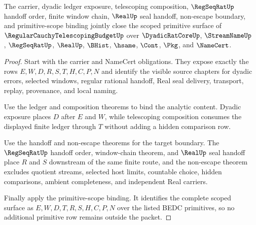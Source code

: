 \begin{theorem}
\label{thm:regular-cauchy-telescoping-budget-scoped-closure}
The carrier, dyadic ledger exposure, telescoping composition, $\RegSeqRatUp$ handoff order, finite window chain, $\RealUp$ seal handoff, non-escape boundary, and primitive-scope binding jointly close the scoped primitive surface of $\RegularCauchyTelescopingBudgetUp$ over $\DyadicRatCoreUp$, $\StreamNameUp$, $\RegSeqRatUp$, $\RealUp$, $\BHist$, $\hsame$, $\Cont$, $\Pkg$, and $\NameCert$.
\end{theorem}
\begin{proof}
Start with the carrier and NameCert obligations. They expose exactly the rows $E,W,D,R,S,T,H,C,P,N$ and identify the visible source chapters for dyadic errors, selected windows, regular rational handoff, Real seal delivery, transport, replay, provenance, and local naming.

Use the ledger and composition theorems to bind the analytic content. Dyadic exposure places $D$ after $E$ and $W$, while telescoping composition consumes the displayed finite ledger through $T$ without adding a hidden comparison row.

Use the handoff and non-escape theorems for the target boundary. The $\RegSeqRatUp$ handoff order, window-chain theorem, and $\RealUp$ seal handoff place $R$ and $S$ downstream of the same finite route, and the non-escape theorem excludes quotient streams, selected host limits, countable choice, hidden comparisons, ambient completeness, and independent Real carriers.

Finally apply the primitive-scope binding. It identifies the complete scoped surface as $E,W,D,T,R,S,H,C,P,N$ over the listed BEDC primitives, so no additional primitive row remains outside the packet.
\end{proof}

